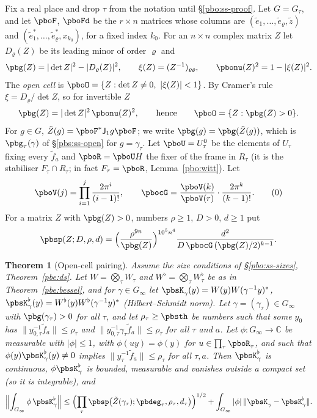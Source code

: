 \documentclass[10pt]{amsart}
\newtheorem{theorem}{Theorem}[section]
\theoremstyle{definition}
\theoremstyle{remark}
\newcommand{\C}{\mathbb C}
\begin{document}
Fix a real place and drop $\tau$ from the notation until \S\ref{pbo:ss-proof}. Let $G=G_\tau$, and
let $\pboF$, $\pboFd$ be the $r\times n$ matrices whose columns are $(\tilde e_1,\dots,\tilde
e_\varrho,\tilde z)$ and $(\tilde e^*_1,\dots,\tilde e^*_\varrho,x_{k_0})$, for a fixed index $k_0$.
For an $n\times n$ complex matrix $Z$ let $D_\varrho(Z)$ be its leading minor of order $\varrho$ and
\[
\pbg(Z)=|\det Z|^2-|D_\varrho(Z)|^2,\qquad \xi(Z)=(Z^{-1})_{\varrho\varrho},\qquad
\pbonu(Z)^2=1-|\xi(Z)|^2 .
\]
The \emph{open cell} is $\pboO=\{Z:\det Z\ne0,\ |\xi(Z)|<1\}$. By Cramer's rule $\xi=D_\varrho/\det Z$,
so for invertible $Z$
\begin{equation}\label{pbo:eq-gnu}
\pbg(Z)=|\det Z|^2\,\pbonu(Z)^2,\qquad\text{hence}\qquad\pboO=\{Z:\pbg(Z)>0\}.
\end{equation}
For $g\in G$, $\tilde Z(g)=\pboF^*\mathsf J_1g\pboF$; we write $\pbg(g)=\pbg(\tilde Z(g))$, which is
$\pbg_\tau(\gamma)$ of \S\ref{pbs:ss-open} for $g=\gamma_\tau$. Let $\pboU=U^0_\tau$ be the elements of
$U_\tau$ fixing every $\tilde f_a$ and $\pboR=\pboU H$ the fixer of the frame in $R_\tau$ (it is the
stabiliser $F_\tau\cap R_\tau$; in fact $F_\tau=\pboR$, Lemma~\ref{pbo:witt}). Let
\[
\pboV(j)=\prod_{i=1}^{j}\frac{2\pi^i}{(i-1)!},\qquad
\pbocG=\frac{\pboV(k)}{\pboV(r)}\cdot\frac{2\pi^k}{(k-1)!}.
\tag{\theequation}\label{pbo:eq-cG}
\]
For a matrix $Z$ with $\pbg(Z)>0$, numbers $\rho\ge1$, $D>0$, $d\ge1$ put
\[
\pbsp(Z;D,\rho,d)=\Bigl(\frac{\rho^{9n}}{\pbg(Z)}\Bigr)^{10^5n^4}\frac{d^2}{D\,\pbocG\,(\pbg(Z)/2)^{k-1}}.
\]

\begin{theorem}[Open-cell pairing]\label{pbo:O1}
Assume the size conditions of \S\ref{pbo:ss-sizes}, Theorem~\ref{pbe:ds}. Let $W=\bigotimes_\tau W_\tau$ and $W^\flat=\bigotimes_\tau
W^\flat_\tau$ be as in Theorem~\ref{pbe:bessel}, and for $\gamma\in G_\infty$ let $\pbsK_\gamma(y)=
W(y)W(\gamma^{-1}y)^*$, $\pbsK^\flat_\gamma(y)=W^\flat(y)W^\flat(\gamma^{-1}y)^*$ (Hilbert--Schmidt
norm). Let $\gamma=(\gamma_\tau)\in G_\infty$ with $\pbg(\gamma_\tau)>0$ for all $\tau$, and let $\rho_\tau\ge
\pbsth$ be numbers such that some $y_0$ has $\|y_{0,\tau}^{-1}\tilde f_a\|\le\rho_\tau$ and
$\|y_{0,\tau}^{-1}\gamma_\tau\tilde f_a\|\le\rho_\tau$ for all $\tau$ and $a$. Let $\phi\colon G_\infty\to
\C$ be measurable with $|\phi|\le1$, with $\phi(uy)=\phi(y)$ for $u\in\prod_\tau\pboR_\tau$, and such
that $\phi(y)\pbsK^\flat_\gamma(y)\ne0$ implies $\|y_\tau^{-1}\tilde f_a\|\le\rho_\tau$ for all $\tau,a$.
Then $\pbsK^\flat_\gamma$ is continuous, $\phi\pbsK^\flat_\gamma$ is bounded, measurable and vanishes outside a compact set (so it is integrable), and
\[
\Bigl\|\int_{G_\infty}\phi\,\pbsK^\flat_\gamma\Bigr\|\le\Bigl(\prod_\tau\pbsp\bigl(\tilde Z(\gamma_\tau);
\pbdeg_\tau,\rho_\tau,d_\tau\bigr)\Bigr)^{1/2}+\int_{G_\infty}|\phi|\,\|\pbsK_\gamma-\pbsK^\flat_\gamma\| .
\]
\end{theorem}
\end{document}
